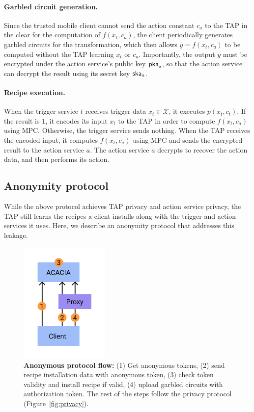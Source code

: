\paragraph{Garbled circuit generation.}
Since the trusted mobile client cannot send the action constant $c_a$ to the TAP
in the clear for the computation of $f(x_t, c_a)$, the client periodically
generates garbled circuits for the transformation, which then allows $y = f(x_t,
c_a)$ to be computed without the TAP learning $x_t$ or $c_a$. Importantly, the
output $y$ must be encrypted under the action service's public key $\mathsf{pka}_a$, so
that the action service can decrypt the result using its secret key $\mathsf{ska}_a$.

\paragraph{Recipe execution.}
When the trigger service $t$ receives trigger data $x_t \in \mathcal{X}$, it
executes $p(x_t, c_t)$. If the result is 1, it encodes its input $x_t$ to the
TAP in order to compute $f(x_t, c_a)$ using MPC. Otherwise, the trigger service
sends nothing. When the TAP receives the encoded input, it computes $f(x_t,
c_a)$ using MPC and sends the encrypted result to the action service $a$. The
action service $a$ decrypts to recover the action data, and then performs its
action.

\subsection{Anonymity protocol}
While the above protocol achieves TAP privacy and action service privacy, the
TAP still learns the recipes a client installs along with the trigger and action
services it uses. Here, we describe an anonymity protocol that addresses this
leakage.

\begin{figure}
\includegraphics[height=6cm]{graphics/Proxy1.png}
\caption{\textbf{Anonymous protocol flow:} (1) Get anonymous tokens, (2) send
  recipe installation data with anonymous token, (3) check token validity and
  install recipe if valid, (4) upload garbled circuits with authorization
  token. The rest of the steps follow the privacy protocol
  (Figure~\ref{fig:privacy}).}
\label{fig:anonymity}
\end{figure}


